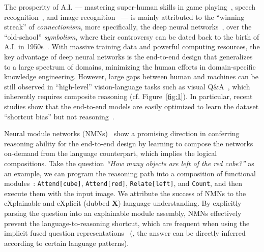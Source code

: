 \documentclass[10pt,twocolumn,letterpaper]{article}
\begin{document}
The prosperity of A.I. --- mastering super-human skills in game playing~\cite{silver2016alphago}, speech recognition~\cite{amodei2016speech}, and image recognition~\cite{he2016deep,ren2015faster} --- is mainly attributed to the ``winning streak'' of \emph{connectionism}, more specifically, the deep neural networks~\cite{lecun2015deep}, over the ``old-school'' \emph{symbolism}, where their controversy can be dated back to the birth of A.I. in 1950s~\cite{minsky1991versus}. With massive training data and powerful computing resources, the key advantage of deep neural networks is the end-to-end design that generalizes to a large spectrum of domains, minimizing the human efforts in  domain-specific knowledge engineering. However, large gaps between human and machines can be still observed in ``high-level'' vision-language tasks such as visual Q\&A~\cite{antol2015vqa,goyal2017vqa2,johnson2017clevr}, which inherently requires composite reasoning (cf. Figure~\ref{fig:1}). In particular, recent studies show that the end-to-end models are easily optimized to learn the dataset ``shortcut bias'' but not reasoning~\cite{johnson2017clevr}.



Neural module networks (NMNs)~\cite{andreas2016neural,johnson2017clevr,hu2017learning,mascharka2018transparency,hu2018explainable,yi2018nsvqa} show a promising direction in conferring reasoning ability for the end-to-end design by learning to compose the networks on-demand from the language counterpart, which implies the logical compositions. Take the question \emph{``How many objects are left of the red cube?''} as an example, we can program the reasoning path into a composition of functional modules~\cite{mascharka2018transparency}: \texttt{Attend[cube]}, \texttt{Attend[red]}, \texttt{Relate[left]}, and \texttt{Count}, and then execute them with the input image.  
We attribute the success of NMNs to the eXplainable and eXplicit (dubbed \textbf{X}) language understanding.
By explicitly parsing the question into an explainable module assembly, NMNs effectively prevent the language-to-reasoning shortcut, which are frequent when using the implicit fused question representations~\cite{antol2015vqa,goyal2017vqa2} (\eg, the answer can be directly inferred according to certain language patterns).
\end{document}
